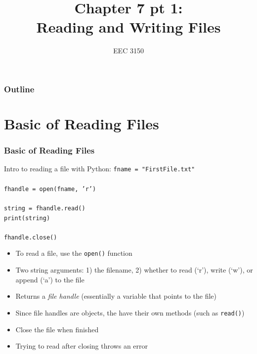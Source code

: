\documentclass{beamer}
\title{Chapter 7 pt 1: \\ Reading and Writing Files}
\author{EEC 3150}
\date{}
\institute{Trevecca Nazarene University}
\newcommand{\code}[1]{\texttt{#1}}
\newcommand{\tab}{\hspace*{22pt}}
\begin{document}
\frame{\titlepage}
 
\begin{frame}	
	\frametitle{Outline}
	\tableofcontents	
\end{frame}


\section{Basic of Reading Files}

\begin{frame}	
\end{frame}

\begin{frame}	
	\frametitle{Basic of Reading Files}
	
	\begin{block}{Intro to reading a file with Python:}
			\code{fname = "FirstFile.txt" \\
					\tab \\
					fhandle = open(fname, 'r')  \\
					\tab \\
					string = fhandle.read() \\
					print(string) \\
					\tab \\
					fhandle.close() 
			}
		\endminipage\hfill
			\begin{itemize}
				\item To read a file, use the \code{open()} function
				\item Two string arguments: 1) the filename, 2) whether to read (`r'), write (`w'), or append (`a') to the file
				\item Returns a \emph{file handle} (essentially a variable that points to the file)
				\item Since file handles are objects, the have their own methods (such as \code{read()})
				\item Close the file when finished
				\item Trying to read after closing throws an error
			\end{itemize}
		\endminipage\hfill
	\end{block}
	
\end{frame}
\end{document}
